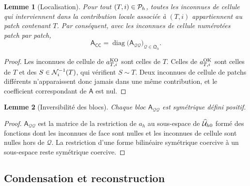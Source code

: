 \documentclass[11pt,a4paper]{article}
\newtheorem{lemma}{Lemme}
\theoremstyle{definition}
\theoremstyle{remark}
\newcommand{\patch}{\mathcal{Q}}
\newcommand{\patches}{\mathfrak{Q}_h}
\newcommand{\A}{\mathsf{A}}
\begin{document}
\begin{lemma}[Localisation]\label{lem:loc}
Pour tout $(T,i)\in\mathcal{P}_h$, toutes les inconnues de cellule qui interviennent dans la contribution
locale associée à $(T,i)$ appartiennent au patch contenant $T$. Par conséquent, avec les inconnues
de cellule numérotées patch par patch,
\[
\A_{\mathsf{CC}}=\operatorname{diag}\big(\A_{\patch\patch}\big)_{\patch\in\patches}.
\]
\end{lemma}

\begin{proof}
Les inconnues de cellule de $a^{\textup{KO}}_{T,i}$ sont celles de $T$. Celles de
$a^{\textup{OK}}_{T,i}$ sont celles de $T$ et des $S\in\mathcal{N}_i^{-1}(T)$, qui vérifient $S\sim T$. Deux
inconnues de cellule de patchs différents n'apparaissent donc jamais dans une même contribution,
et le coefficient correspondant de $\A$ est nul.
\end{proof}

\begin{lemma}[Inversibilité des blocs]
Chaque bloc $\A_{\patch\patch}$ est symétrique défini positif.
\end{lemma}

\begin{proof}
$\A_{\patch\patch}$ est la matrice de la restriction de $a_h$ au sous-espace de $\widehat{\mathcal{U}}_{h0}$ formé des
fonctions dont les inconnues de face sont nulles et les inconnues de cellule sont nulles hors de
$\patch$. La restriction d'une forme bilinéaire symétrique coercive à un sous-espace reste
symétrique coercive.
\end{proof}

\subsection{Condensation et reconstruction}
\end{document}
